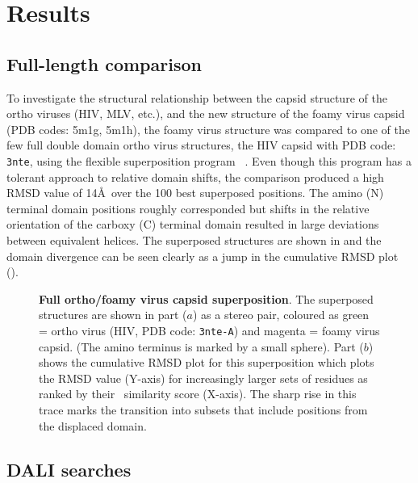 \section{Results}

\subsection{Full-length comparison}

To investigate the structural relationship between the capsid structure of the ortho viruses (HIV, MLV, etc.),
and the new structure of the foamy virus capsid \cite{BallNJet16} (PDB codes: 5m1g, 5m1h), the foamy virus structure was
compared to one of the few full double domain ortho virus structures, the HIV capsid with PDB code: {\tt 3nte},
using the flexible superposition program \SAP\ \cite{TaylorWR99a}.   Even though this program has a tolerant approach
to relative domain shifts, the comparison produced a high RMSD value of 14\AA\ over the 100 best superposed
positions.   The amino (N) terminal domain positions roughly corresponded but shifts in the relative
orientation of the carboxy (C) terminal domain resulted in large deviations between equivalent helices.  
The superposed structures are shown in  and the domain divergence can be seen clearly as a
jump in the cumulative RMSD plot ().

\begin{figure}
\centering
{}
\begin{footnotesize}
\caption{
\label{Fig:full}
{\bf Full ortho/foamy virus capsid superposition}.
The superposed structures are shown in part ($a$) as a stereo pair, coloured as green = ortho virus (HIV, PDB code: {\tt 3nte-A})
and magenta = foamy virus capsid.   (The amino terminus is marked by a small sphere).
Part ($b$) shows the cumulative RMSD plot for this superposition which plots the RMSD value (Y-axis) for increasingly larger sets
of residues as ranked by their \SAP\ similarity score (X-axis).   The sharp rise in this trace marks the transition into 
subsets that include positions from the displaced domain.
}
\end{footnotesize}
\end{figure}

\subsection{DALI searches}

